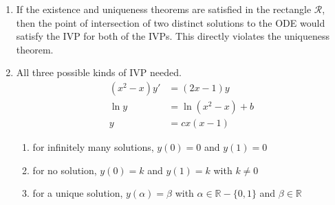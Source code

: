 \begin{enumerate}
    \item If the existence and uniqueness theorems are satisfied in the rectangle $ \mathcal{R} $,
          then the point of intersection of two distinct solutions to the ODE would satisfy the IVP for
          both of the IVPs. This directly violates the uniqueness theorem.

    \item All three possible kinds of IVP needed.
          \begin{align}
              (x^{2} - x)y' & = (2x - 1)y         \\
              \ln y         & = \ln (x^{2}-x) + b \\
              y             & = cx(x-1)
          \end{align}
          \begin{enumerate}
              \item for infinitely many solutions, $ y(0) = 0 $ and $ y(1) = 0 $
              \item for no solution, $ y(0) = k $ and $ y(1) = k $ with $ k \neq 0 $
              \item for a unique solution, $ y(\alpha) = \beta $ with
                    $ \alpha \in \mathbb{R} - \{0, 1\} $ and $ \beta \in \mathbb{R} $
          \end{enumerate}
\end{enumerate}